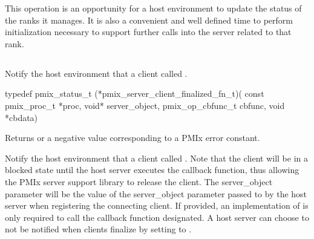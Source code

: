 \advicermstart
 This operation is an opportunity for a host environment
 to update the status of the ranks it manages.  It is also a convenient and well defined time to perform initialization necessary to
 support further calls into the server related to that rank.
 \advicermend

\subsection{}

\summary

Notify the host environment that a client called .

\format

\cspecificstart
\begin{codepar}
typedef pmix_status_t (*pmix_server_client_finalized_fn_t)(
                             const pmix_proc_t *proc,
                             void* server_object,
                             pmix_op_cbfunc_t cbfunc,
                             void *cbdata)
\end{codepar}
\cspecificend

\begin{arglist}
\end{arglist}

Returns  or a negative value corresponding to a \ac{PMIx} error constant.

\descr

Notify the host environment that a client called .
Note that the client will be in a blocked state until the host server executes the callback function, thus allowing the PMIx server support library to release the client.
The server_object parameter will be the value of the server_object parameter passed to
 by the host server when registering the connecting client.  If provided, an implementation of 
is only required to
call the callback function designated.  A host server can choose to not be notified when clients finalize by setting  to .

